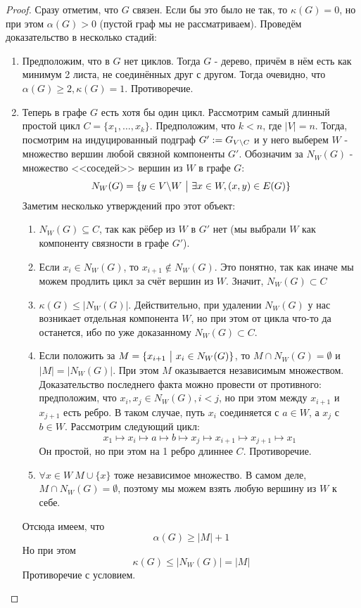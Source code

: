 \begin{proof}
	Сразу отметим, что $G$ связен. Если бы это было не так, то $\kappa(G) = 0$, но при этом $\alpha(G) > 0$ (пустой граф мы не рассматриваем).
	Проведём доказательство в несколько стадий:
	\begin{enumerate}
		\item Предположим, что в $G$ нет циклов. Тогда $G$ - дерево, причём в нём есть как минимум 2 листа, не соединённых друг с другом. Тогда очевидно, что $\alpha(G) \ge 2, \kappa(G) = 1$. Противоречие.
		
		\item Теперь в графе $G$ есть хотя бы один цикл. Рассмотрим самый длинный простой цикл $C = \{x_1, \ldots, x_k\}$. Предположим, что $k < n$, где $|V| = n$. Тогда, посмотрим на индуцированный подграф $G' := G_{V \backslash C}$ и у него выберем $W$ - множество вершин любой связной компоненты $G'$. Обозначим за $N_W(G)$ - множество <<соседей>> вершин из $W$ в графе $G$:
		\[
			N_W(G) = \{y \in V \backslash W \ \big|\  \exists x \in W, (x, y) \in E(G)\}
		\]
		Заметим несколько утверждений про этот объект:
		\begin{enumerate}
			\item $N_W(G) \subseteq C$, так как рёбер из $W$ в $G'$ нет (мы выбрали $W$ как компоненту связности в графе $G'$).
			
			\item Если $x_i \in N_W(G)$, то $x_{i + 1} \notin N_W(G)$. Это понятно, так как иначе мы можем продлить цикл за счёт вершин из $W$. Значит, $N_W(G) \subset C$
			
			\item $\kappa(G) \le |N_W(G)|$. Действительно, при удалении $N_W(G)$ у нас возникает отдельная компонента $W$, но при этом от цикла что-то да останется, ибо по уже доказанному $N_W(G) \subset C$.
			
			\item Если положить за $M = \{x_{i + 1} \ \big|\  x_i \in N_W(G)\}$, то $M \cap N_W(G) = \emptyset$ и $|M| = |N_W(G)|$. При этом $M$ оказывается независимым множеством. Доказательство последнего факта можно провести от противного: предположим, что $x_i, x_j \in N_W(G), i < j$, но при этом между $x_{i + 1}$ и $x_{j + 1}$ есть ребро. В таком случае, путь $x_i$ соединяется с $a \in W$, а $x_j$ с $b \in W$. Рассмотрим следующий цикл:
			\[
				x_1 \mapsto x_i \mapsto a \mapsto b \mapsto x_j \mapsto x_{i + 1} \mapsto x_{j + 1} \mapsto x_1
			\]
			Он простой, но при этом на 1 ребро длиннее $C$. Противоречие.
			
			\item $\forall x \in W\ M \cup \{x\}$ тоже независимое множество. В самом деле, $M \cap N_W(G) = \emptyset$, поэтому мы можем взять любую вершину из $W$ к себе.
		\end{enumerate}
	
		Отсюда имеем, что
		\[
			\alpha(G) \ge |M| + 1
		\]
		Но при этом
		\[
			\kappa(G) \le |N_W(G)| = |M|
		\]
		Противоречие с условием.
	\end{enumerate}
\end{proof}

